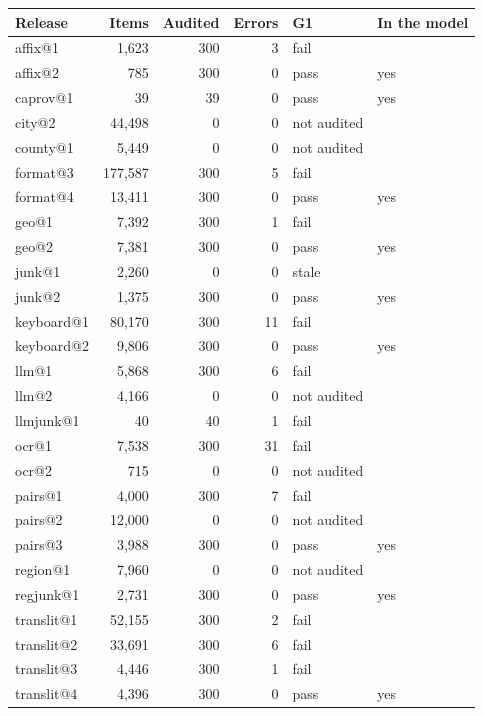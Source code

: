 \begin{tabular}{lrrrll}
\toprule
Release & Items & Audited & Errors & G1 & In the model \\
\midrule
affix@1 & 1{,}623 & 300 & 3 & fail &  \\
affix@2 & 785 & 300 & 0 & pass & yes \\
caprov@1 & 39 & 39 & 0 & pass & yes \\
city@2 & 44{,}498 & 0 & 0 & not audited &  \\
county@1 & 5{,}449 & 0 & 0 & not audited &  \\
format@3 & 177{,}587 & 300 & 5 & fail &  \\
format@4 & 13{,}411 & 300 & 0 & pass & yes \\
geo@1 & 7{,}392 & 300 & 1 & fail &  \\
geo@2 & 7{,}381 & 300 & 0 & pass & yes \\
junk@1 & 2{,}260 & 0 & 0 & stale &  \\
junk@2 & 1{,}375 & 300 & 0 & pass & yes \\
keyboard@1 & 80{,}170 & 300 & 11 & fail &  \\
keyboard@2 & 9{,}806 & 300 & 0 & pass & yes \\
llm@1 & 5{,}868 & 300 & 6 & fail &  \\
llm@2 & 4{,}166 & 0 & 0 & not audited &  \\
llmjunk@1 & 40 & 40 & 1 & fail &  \\
ocr@1 & 7{,}538 & 300 & 31 & fail &  \\
ocr@2 & 715 & 0 & 0 & not audited &  \\
pairs@1 & 4{,}000 & 300 & 7 & fail &  \\
pairs@2 & 12{,}000 & 0 & 0 & not audited &  \\
pairs@3 & 3{,}988 & 300 & 0 & pass & yes \\
region@1 & 7{,}960 & 0 & 0 & not audited &  \\
regjunk@1 & 2{,}731 & 300 & 0 & pass & yes \\
translit@1 & 52{,}155 & 300 & 2 & fail &  \\
translit@2 & 33{,}691 & 300 & 6 & fail &  \\
translit@3 & 4{,}446 & 300 & 1 & fail &  \\
translit@4 & 4{,}396 & 300 & 0 & pass & yes \\
\bottomrule
\end{tabular}
